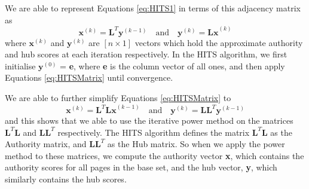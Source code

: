 \documentclass[11pt]{report}
\begin{document}
We are able to represent Equations \eqref{eq:HITS1} in terms of this adjacency matrix as \begin{equation} \label{eq:HITSMatrix}
\textbf{x}^{(k)} = \textbf{L}^T\textbf{y}^{(k-1)}\quad\mathrm{and}\quad \textbf{y}^{(k)}=\textbf{Lx}^{(k)}
\end{equation} where \(\textbf{x}^{(k)}\) and \(\textbf{y}^{(k)}\) are $[\textit{n}\times 1]$ vectors which hold the approximate authority and hub scores at each iteration respectively. In the HITS algorithm, we first initialise $\textbf{y}^{(0)}$ = \textbf{e}, where \textbf{e} is the column vector of all ones, and then apply Equations \eqref{eq:HITSMatrix} until convergence. 

We are able to further simplify Equations \eqref{eq:HITSMatrix} to \begin{equation} \label{eq:HITSSimplify}
\textbf{x}^{(k)} = \textbf{L}^T\textbf{Lx}^{(k-1)}\quad\mathrm{and}\quad \textbf{y}^{(k)}=\textbf{LL}^T\textbf{y}^{(k-1)}
\end{equation} and this shows that we able to use the iterative power method on the matrices $\textbf{L}^T\textbf{L}$ and $\textbf{LL}^T$ respectively. The HITS algorithm defines the matrix $\textbf{L}^T\textbf{L}$ as the Authority matrix, and $\textbf{LL}^T$ as the Hub matrix. So when we apply the power method to these matrices, we compute the authority vector \textbf{x}, which contains the authority scores for all pages in the base set, and the hub vector, \textbf{y}, which similarly contains the hub scores.
\end{document}
